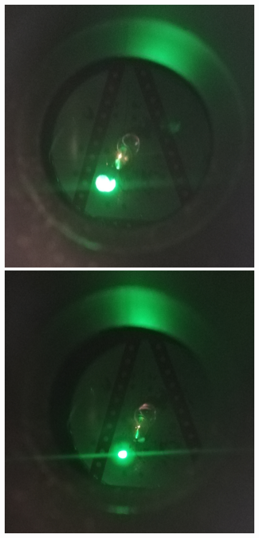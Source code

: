 \begin{figure}[h!]
\centering
\begin{minipage}[c]{200pt}
\includegraphics[width=\textwidth]{Figure/05/DvaSvazky.jpg}
\end{minipage}
\begin{minipage}[c]{200pt}
\includegraphics[width=\textwidth]{Figure/05/Optimum.jpg}

\end{minipage}
\end{figure}
